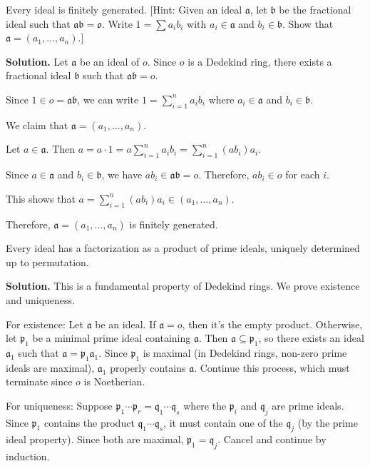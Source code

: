\begin{problembox}
Every ideal is finitely generated. [Hint: Given an ideal $\mathfrak{a}$, let $\mathfrak{b}$ be the fractional ideal such that $\mathfrak{a}\mathfrak{b} = \mathfrak{o}$. Write $1 = \sum a_i b_i$ with $a_i \in \mathfrak{a}$ and $b_i \in \mathfrak{b}$. Show that $\mathfrak{a} = (a_1, \ldots, a_n)$.]
\end{problembox}

\noindent\textbf{Solution.}
Let $\mathfrak{a}$ be an ideal of $o$. Since $o$ is a Dedekind ring, there exists a fractional ideal $\mathfrak{b}$ such that $\mathfrak{a}\mathfrak{b} = o$.

Since $1 \in o = \mathfrak{a}\mathfrak{b}$, we can write $1 = \sum_{i=1}^n a_i b_i$ where $a_i \in \mathfrak{a}$ and $b_i \in \mathfrak{b}$.

We claim that $\mathfrak{a} = (a_1, \ldots, a_n)$.

Let $a \in \mathfrak{a}$. Then $a = a \cdot 1 = a \sum_{i=1}^n a_i b_i = \sum_{i=1}^n (a b_i) a_i$.

Since $a \in \mathfrak{a}$ and $b_i \in \mathfrak{b}$, we have $a b_i \in \mathfrak{a}\mathfrak{b} = o$. Therefore, $a b_i \in o$ for each $i$.

This shows that $a = \sum_{i=1}^n (a b_i) a_i \in (a_1, \ldots, a_n)$.

Therefore, $\mathfrak{a} = (a_1, \ldots, a_n)$ is finitely generated.

\begin{problembox}
Every ideal has a factorization as a product of prime ideals, uniquely determined up to permutation.
\end{problembox}

\noindent\textbf{Solution.}
This is a fundamental property of Dedekind rings. We prove existence and uniqueness.

For existence: Let $\mathfrak{a}$ be an ideal. If $\mathfrak{a} = o$, then it's the empty product. Otherwise, let $\mathfrak{p}_1$ be a minimal prime ideal containing $\mathfrak{a}$. Then $\mathfrak{a} \subseteq \mathfrak{p}_1$, so there exists an ideal $\mathfrak{a}_1$ such that $\mathfrak{a} = \mathfrak{p}_1 \mathfrak{a}_1$. Since $\mathfrak{p}_1$ is maximal (in Dedekind rings, non-zero prime ideals are maximal), $\mathfrak{a}_1$ properly contains $\mathfrak{a}$. Continue this process, which must terminate since $o$ is Noetherian.

For uniqueness: Suppose $\mathfrak{p}_1 \cdots \mathfrak{p}_r = \mathfrak{q}_1 \cdots \mathfrak{q}_s$ where the $\mathfrak{p}_i$ and $\mathfrak{q}_j$ are prime ideals. Since $\mathfrak{p}_1$ contains the product $\mathfrak{q}_1 \cdots \mathfrak{q}_s$, it must contain one of the $\mathfrak{q}_j$ (by the prime ideal property). Since both are maximal, $\mathfrak{p}_1 = \mathfrak{q}_j$. Cancel and continue by induction.

